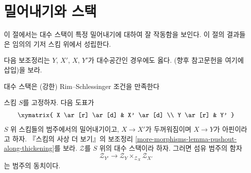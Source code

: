 \section{밀어내기와 스택}
\label{section-pushouts}

\noindent
이 절에서는 대수 스택이 특정 밀어내기에 대하여 잘 작동함을 보인다.
이 절의 결과들은 임의의 기저 스킴 위에서 성립한다.

\medskip\noindent
다음 보조정리는 $Y$, $X'$, $X$, $Y'$가 대수공간인 경우에도 옳다.
(향후 참고문헌을 여기에 삽입)을 보라.

\begin{lemma}
\label{lemma-pushout}
\begin{slogan}
대수 스택은 (강한) Rim--Schlessinger 조건을 만족한다
\end{slogan}
스킴 $S$를 고정하자. 다음 도표가
$$
\xymatrix{
X \ar[r] \ar[d] & X' \ar[d] \\
Y \ar[r] & Y'
}
$$
$S$ 위 스킴들의 범주에서의 밀어내기이고, $X \to X'$가 두꺼워짐이며
$X \to Y$가 아핀이라고 하자. 『스킴의 사상 더 보기』의 보조정리
\ref{more-morphisms-lemma-pushout-along-thickening}를 보라.
$\mathcal{Z}$를 $S$ 위의 대수 스택이라 하자. 그러면 섬유 범주의 함자
$$
\mathcal{Z}_{Y'}
\longrightarrow
\mathcal{Z}_Y \times_{\mathcal{Z}_X} \mathcal{Z}_{X'}
$$
는 범주의 동치이다.
\end{lemma}

